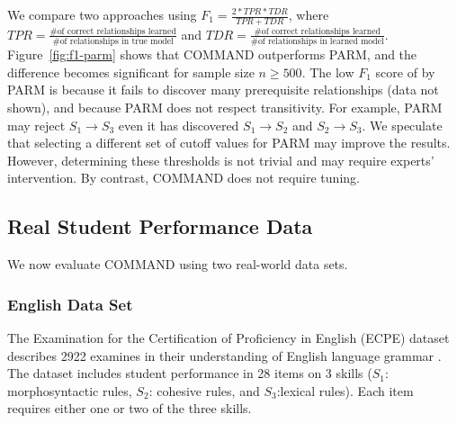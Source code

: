 \documentclass{edm_template}
\begin{document}
	We compare two approaches using 
	$F_1=\frac{2*TPR*TDR}{TPR+TDR}$, where $TPR=\frac{\text{\# of correct relationships learned}}{\text{\# of relationships in true model}}$
	and $TDR=\frac{\text{\# of correct relationships learned}}{\text{\# of relationships in learned model}}$.
	Figure~\ref{fig:f1-parm} shows that COMMAND  outperforms PARM, and the difference becomes significant for sample size $n\ge 500$.
	The low $F_1$ score of by PARM is %
	because it fails to discover many prerequisite relationships (data not shown), and because  PARM does not respect transitivity.
	For example, PARM may reject $S_1\rightarrow S_3$ even it has discovered $S_1\rightarrow S_2$ and $S_2\rightarrow S_3$.
	We speculate that selecting a different set of cutoff values for PARM may improve the results.
	However, determining these thresholds is not trivial and may require experts' intervention. By contrast, COMMAND does not require tuning. %
	
			
			
		
					
	\subsection{Real Student Performance Data}
	\label{sec:real}
	We now evaluate COMMAND using two real-world data sets.	
	
	\subsubsection{English Data Set}
	The Examination for the Certification of Proficiency in English (ECPE) dataset describes 2922 examines in their understanding of English language grammar \cite{templin2014hierarchical}.
	The dataset includes student performance in 28 items on 3 skills ($S_1$: morphosyntactic rules, $S_2$: cohesive rules,
	and $S_3$:lexical rules). Each item requires either one or two of the three skills.
	
\end{document}
